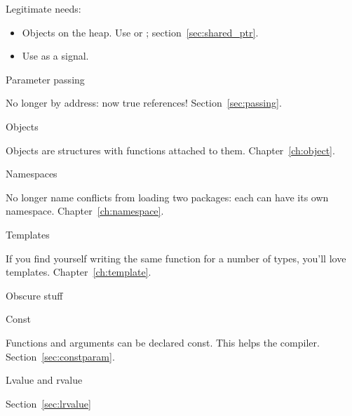 Legitimate needs:
\begin{itemize}
\item Objects on the heap. Use  or
  ; section~\ref{sec:shared_ptr}.
\item Use  as a signal.
\end{itemize}

 {Parameter passing}

No longer by address: now true references! Section~\ref{sec:passing}.

 {Objects}

Objects are structures with functions attached to
them. Chapter~\ref{ch:object}.

 {Namespaces}

No longer name conflicts from loading two packages: each can have its
own namespace. Chapter~\ref{ch:namespace}.

 {Templates}

If you find yourself writing the same function for a number of types,
you'll love templates. Chapter~\ref{ch:template}.

 {Obscure stuff}

 {Const}

Functions and arguments can be declared const. This helps the
compiler. Section~\ref{sec:constparam}.

 {Lvalue and rvalue}

Section~\ref{sec:lrvalue}

\endinput

You’ll have no destructors, so cleanup is manual. This is most fun
with early-return functions, but it can keep you entertained for all
cases. File handles, memory, and other resources (thread locks,
anyone) are all waiting patiently and silently for you to forget them.

Initialization has be be explicitly called. No constructors either.

Want inheritance? Sure. Write your own vtable (often done with function pointers in a struct).
Instead of templates, you’ll need to abandon type safety and cast back and forth to (void*). Don’t explicitly cast to (void *), because the compiler never warns about explicit or implicit casts to and from (void *).

You’ll also need to make sure you’re using the right library calls - snprintf versus sprintf etc. Hopefully an existing project will be using the right ones.

